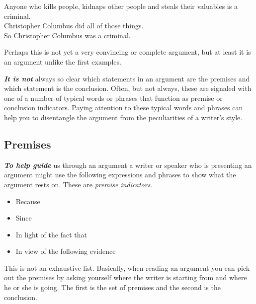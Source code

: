 \documentclass[12pt, openany]{book}
\makeatletter
\providecommand{\tightlist}{%
  \setlength{\itemsep}{0pt}\setlength{\parskip}{0pt}}
\newenvironment{kframe}{%
\medskip{}
\setlength{\fboxsep}{.8em}
 \def\at@end@of@kframe{}%
 \ifinner\ifhmode%
  \def\at@end@of@kframe{\end{minipage}}%
  \begin{minipage}{\columnwidth}%
 \fi\fi%
 \def\FrameCommand##1{\hskip\@totalleftmargin \hskip-\fboxsep
 \colorbox{shadecolor}{##1}\hskip-\fboxsep
     \hskip-\linewidth \hskip-\@totalleftmargin \hskip\columnwidth}%
 \MakeFramed {\advance\hsize-\width
   \@totalleftmargin\z@ \linewidth\hsize
   \@setminipage}}%
 {\par\unskip\endMakeFramed%
 \at@end@of@kframe}
\newenvironment{rmdblock}[1]
  {
  \begin{itemize}
  \renewcommand{\labelitemi}{
    \raisebox{-.7\height}[0pt][0pt]{
      {\setkeys{Gin}{width=3em,keepaspectratio}\texttt{[image: img/\#1]}}
    }
  }
  \setlength{\fboxsep}{1em}
  \begin{kframe}
  \item
  }
  {
  \end{kframe}
  \end{itemize}
  }
\newenvironment{note}
  {\begin{rmdblock}{note}}
  {\end{rmdblock}}
\makeatother
\begin{document}
\begin{center}

\begin{argument}

Anyone who kills people, kidnaps other people and steals their valuables is a criminal.\\
Christopher Columbus did all of those things.\\

So Christopher Columbus was a criminal.

\end{argument}

\end{center}

Perhaps this is not yet a very convincing or complete argument, but at least it is an argument unlike the first examples.

\textbf{\emph{It is not}} always so clear which statements in an argument are the premises and which statement is the conclusion. Often, but not always, these are signaled with one of a number of typical words or phrases that function as premise or conclusion indicators. Paying attention to these typical words and phrases can help you to disentangle the argument from the peculiarities of a writer's style.

\hypertarget{premises}{%
\subsection*{Premises}\label{premises}}


\textbf{\emph{To help guide}} us through an argument a writer or speaker who is presenting an argument might use the following expressions and phrases to show what the argument rests on. These are \emph{premise indicators}.

\begin{note}

\begin{itemize}
\tightlist
\item
  Because
\item
  Since
\item
  In light of the fact that
\item
  In view of the following evidence
\end{itemize}

\end{note}

This is not an exhaustive list. Basically, when reading an argument you can pick out the premises by asking yourself where the writer is starting from and where he or she is going. The first is the set of premises and the second is the conclusion.
\end{document}
